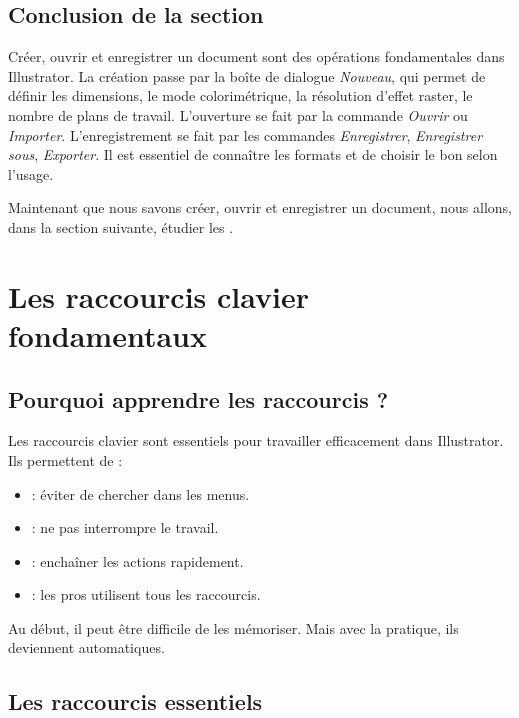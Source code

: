\subsection*{Conclusion de la section}

Créer, ouvrir et enregistrer un document sont des opérations fondamentales dans Illustrator. La création passe par la boîte de dialogue \emph{Nouveau}, qui permet de définir les dimensions, le mode colorimétrique, la résolution d'effet raster, le nombre de plans de travail. L'ouverture se fait par la commande \emph{Ouvrir} ou \emph{Importer}. L'enregistrement se fait par les commandes \emph{Enregistrer}, \emph{Enregistrer sous}, \emph{Exporter}. Il est essentiel de connaître les formats et de choisir le bon selon l'usage.

Maintenant que nous savons créer, ouvrir et enregistrer un document, nous allons, dans la section suivante, étudier les .

\section{Les raccourcis clavier fondamentaux}

\subsection{Pourquoi apprendre les raccourcis ?}

Les raccourcis clavier sont essentiels pour travailler efficacement dans Illustrator. Ils permettent de :

\begin{itemize}
    \item {} : éviter de chercher dans les menus.
    \item {} : ne pas interrompre le travail.
    \item {} : enchaîner les actions rapidement.
    \item {} : les pros utilisent tous les raccourcis.
\end{itemize}

Au début, il peut être difficile de les mémoriser. Mais avec la pratique, ils deviennent automatiques.

\subsection{Les raccourcis essentiels}

